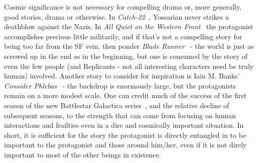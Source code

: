 Cosmic significance is not necessary for compelling drama or, more
generally, good stories, drama or otherwise. In
\emph{Catch-22}~\cite{Catch22}, Yossarian never strikes a deathblow against
the Nazis. In \emph{All Quiet on the Western
Front}~\cite{AllQuietOnTheWesternFront} the protagonist accomplishes precious
little militarily, and if that's not a compelling
story for being too far from the SF vein, then ponder \emph{Blade
Runner}~\cite{BladeRunner} - the world is just as screwed up in the end
as in the beginning, but one is consumed by the story of even the few
people (and Replicants - not all interesting characters need be truly
human) involved. Another story to consider for inspiration is Iain M. Banks' \emph{Consider Phlebas}~\cite{ConsiderPhlebas} - the backdrop is enormously large, but the protagonists remain on a more modest scale. One can credit much of the success of the first
season of the new
Battlestar Galactica series~\cite{NewBattleStar}, and the relative decline of subsequent seasons,  to the strength that
can come from focusing on human interactions and frailties even in a
dire and cosmically important situation. In short, it is sufficient
for the story the protagonist is directly entangled in to be important
to the protagonist and those around him/her, even if it is not direly
important to most of the other beings in existence.

